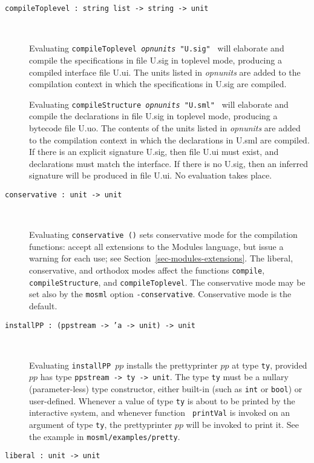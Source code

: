 \documentclass[fleqn]{article}
\begin{document}
\begin{description}
\item[{\tt compileToplevel :\ string list -> string -> unit}]\mbox{ }
  
  Evaluating \texttt{compileToplevel \textit{opnunits} "{\rm U.sig}" }
  will elaborate and compile the specifications in file U.sig in
  toplevel mode, producing a compiled interface file U.ui.  The units
  listed in \textit{opnunits} are added to the compilation context in
  which the specifications in U.sig are compiled.
  
  Evaluating \texttt{compileStructure \textit{opnunits} "{\rm U.sml}"
    } will elaborate and compile the declarations in file U.sig in
  toplevel mode, producing a bytecode file U.uo.  The contents of the
  units listed in \textit{opnunits} are added to the compilation
  context in which the declarations in U.sml are compiled.  If there
  is an explicit signature U.sig, then file U.ui must exist, and
  declarations must match the interface.  If there is no U.sig, then
  an inferred signature will be produced in file U.ui.  No evaluation
  takes place.

\item[{\tt conservative :\ unit -> unit}]\mbox{ }
  
  Evaluating \texttt{conservative ()} sets conservative mode for the
  compilation functions: accept all extensions to the Modules
  language, but issue a warning for each use; see
  Section~\ref{sec-modules-extensions}.  The liberal, conservative,
  and orthodox modes affect the functions \texttt{compile},
  \texttt{compileStructure}, and \texttt{compileToplevel}.  The
  conservative mode may be set also by the \texttt{mosml} option
  \texttt{-conservative}.  Conservative mode is the default.

\item[{\tt installPP :\ (ppstream -> 'a -> unit) -> unit}]\mbox{ }

  Evaluating {\tt installPP $pp$} installs the prettyprinter $pp$ at
  type {\tt ty}, provided $pp$ has type {\tt ppstream -> ty -> unit}.
  The type {\tt ty} must be a nullary (parameter-less) type
  constructor, either built-in (such as {\tt int} or {\tt bool}) or
  user-defined.  Whenever a value of type {\tt ty} is about to be
  printed by the interactive system, and whenever function {\tt
    printVal} is invoked on an argument of type {\tt ty}, the
  prettyprinter $pp$ will be invoked to print it.  See the example in
  {\tt mosml/examples/pretty}.

\item[{\tt liberal :\ unit -> unit}]\mbox{ }
  

\end{description}
\end{document}
